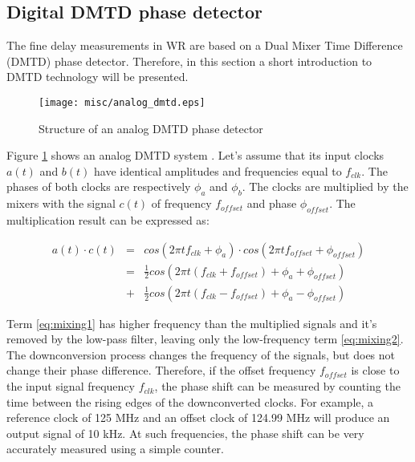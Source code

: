 \subsection{Digital DMTD phase detector}
\label{s:dmtd}
The fine delay measurements in WR are based on a Dual Mixer Time Difference
(DMTD) phase detector. Therefore, in this section a short introduction to
DMTD technology will be presented.
\begin{figure}[ht!]
  \centering
  \texttt{[image: misc/analog\_dmtd.eps]}
  \caption{Structure of an analog DMTD phase detector}
  \label{fig:analog_dmtd}
\end{figure}
Figure \ref{fig:analog_dmtd} shows an analog DMTD system \cite{allan90}. Let's
assume that its input clocks $a(t)$ and $b(t)$ have identical amplitudes and
frequencies equal to $f_{clk}$. The phases of both clocks are respectively
$\phi_{a}$ and $\phi_{b}$. The clocks are multiplied by the mixers with
the signal $c(t)$ of frequency $f_{offset}$ and phase $\phi_{offset}$. The
multiplication result can be expressed as:

\begin{eqnarray}
    a(t) \cdot c(t) & = & cos(2\pi t f_{clk} + \phi_{a}) \cdot cos (2\pi t
    f_{offset} + \phi_{offset}) \nonumber \\
\label{eq:mixing1}& = & \frac{1}{2} cos(2\pi t (f_{clk} + f_{offset}) +
\phi_a + \phi_{offset}) \\
\label{eq:mixing2}& + & \frac{1}{2} cos (2 \pi t (f_{clk} - f_{offset}) +
\phi_a - \phi_{offset})
\end{eqnarray}

Term \ref{eq:mixing1} has higher frequency than the multiplied signals and
it's removed by the low-pass filter, leaving only the low-frequency term
\ref{eq:mixing2}. The downconversion process changes the frequency of the
signals, but does not change their phase difference. Therefore, if the offset
frequency $f_{offset}$ is close to the input signal frequency $f_{clk}$,
the phase shift can be measured by counting the time between the rising
edges of the downconverted clocks. For example, a reference clock of 125
MHz and an offset clock of 124.99 MHz will produce an output signal of 10
kHz. At such frequencies, the phase shift can be very accurately measured
using a simple counter.

